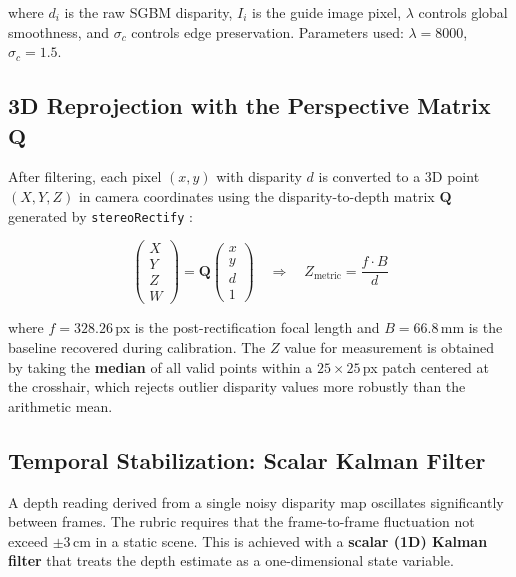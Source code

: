 \documentclass[12pt, a4paper]{article}
\begin{document}
where $d_i$ is the raw SGBM disparity, $I_i$ is the guide image pixel,
$\lambda$ controls global smoothness, and $\sigma_c$ controls edge preservation.
Parameters used: $\lambda = 8000$, $\sigma_c = 1.5$.

\subsection{3D Reprojection with the Perspective Matrix $\mathbf{Q}$}

After filtering, each pixel $(x, y)$ with disparity $d$ is converted to a 3D point
$(X, Y, Z)$ in camera coordinates using the disparity-to-depth matrix
$\mathbf{Q}$ generated by \texttt{stereoRectify} \cite{bradski2008learning}:

\begin{equation}
\label{eq:Q}
  \begin{pmatrix} X \\ Y \\ Z \\ W \end{pmatrix}
  = \mathbf{Q} \begin{pmatrix} x \\ y \\ d \\ 1 \end{pmatrix}
  \quad \Longrightarrow \quad
  Z_{\text{metric}} = \frac{f \cdot B}{d}
\end{equation}

where $f = 328.26$\,px is the post-rectification focal length and $B = 66.8$\,mm
is the baseline recovered during calibration. The $Z$ value for measurement is
obtained by taking the \textbf{median} of all valid points within a $25 \times 25$\,px
patch centered at the crosshair, which rejects outlier disparity values more robustly
than the arithmetic mean.

\subsection{Temporal Stabilization: Scalar Kalman Filter}
\label{sec:kalman}

A depth reading derived from a single noisy disparity map oscillates significantly
between frames. The rubric requires that the frame-to-frame fluctuation not exceed
$\pm3$\,cm in a static scene. This is achieved with a \textbf{scalar (1D) Kalman
filter} \cite{kalman1960new} that treats the depth estimate as a one-dimensional
state variable.
\end{document}
